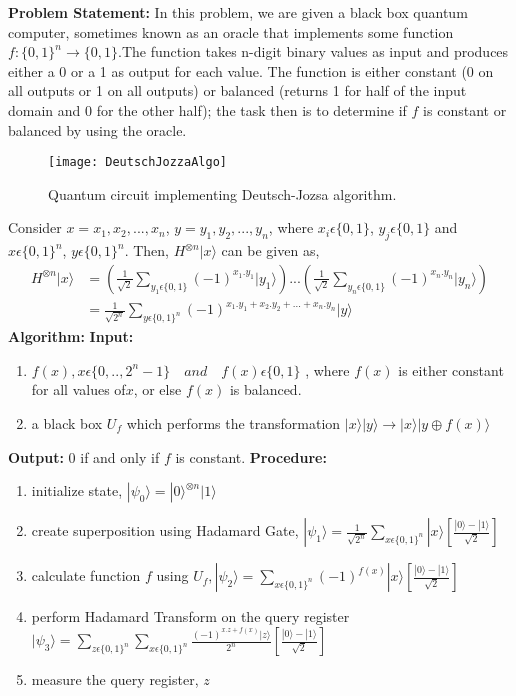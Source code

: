 \documentclass[12pt]{report}
\begin{document}
\textbf{Problem Statement:} \newline
In this problem, we are given a black box quantum computer, sometimes known as an oracle that implements some function $f:\{0,1\}^{n}\to\{0,1\}$.The function takes n-digit binary values as input and produces either a 0 or a 1 as output for each value. The function is either constant (0 on all outputs or 1 on all outputs) or balanced (returns 1 for half of the input domain and 0 for the other half); the task then is to determine if $f$ is constant or balanced by using the oracle. 
\begin{figure}[h]
\centering
\texttt{[image: DeutschJozzaAlgo]}
\caption{Quantum circuit implementing Deutsch-Jozsa algorithm.}
\label{fig:deutschjozzaalgo}
\end{figure}
\newline
Consider $x=x_{1},x_{2},...,x_{n}$, $y=y_{1},y_{2},...,y_{n}$, where $ x_{i} \epsilon \{0,1\}$, $y_{j} \epsilon \{0,1\}$ and $x\epsilon\{0,1\}^{n}$, $y\epsilon\{0,1\}^{n}$. Then, $H^{\otimes n}|x\rangle$ can be given as,
\begin{equation}
\begin{split}
H^{\otimes n}|x\rangle & = (\frac{1}{\sqrt{2}}\sum\limits_{y_{1}\epsilon\{0,1\}} (-1)^{x_{1}.y_{1}} |y_{1}\rangle)...(\frac{1}{\sqrt{2}}\sum\limits_{y_{n}\epsilon\{0,1\}} (-1)^{x_{n}.y_{n}} |y_{n}\rangle) \\
	& = \frac{1}{\sqrt{2^{n}}} \sum\limits_{y\epsilon\{0,1\}^{n}} (-1)^{x_{1}.y_{1}+x_{2}.y_{2}+...+x_{n}.y_{n}} |y\rangle
\end{split}
\end{equation}
\textbf{Algorithm:}\newline
\textbf{Input:}
\begin{enumerate}
	\item $f(x), x \epsilon \{0,..,2^{n}-1\} \quad and \quad f(x) \epsilon \{0,1\}$ , where $f(x)$ is either constant for all values of$x$, or else $f(x)$ is balanced.
	\item a black box $U_{f}$ which performs the transformation  $|x\rangle|y\rangle \to |x\rangle|y\oplus f(x)\rangle$
\end{enumerate}
\textbf{Output:} 0 if and only if $f$ is constant.
\newline\textbf{Procedure:}
\begin{enumerate}
	\item initialize state, $|\psi_{0}\rangle = |0\rangle^{\otimes n} |1\rangle$
	\item create superposition using Hadamard Gate, $ |\psi_{1}\rangle = \frac{1}{\sqrt{2^{n}}} \sum\limits_{x \epsilon\{0,1\}^{n}}|x\rangle\left[\frac{|0\rangle - |1\rangle}{\sqrt{2}}\right]$
	\item calculate function $f$ using $U_{f}, |\psi_{2}\rangle = \sum\limits_{x \epsilon\{0,1\}^{n}} (-1)^{f(x)}|x\rangle\left[\frac{|0\rangle - |1\rangle}{\sqrt{2}}\right]$
	\item perform Hadamard Transform on the query register $|\psi_{3}\rangle = \sum\limits_{z\epsilon\{0,1\}^{n}}\sum\limits_{x\epsilon\{0,1\}^{n}} \frac{(-1)^{x.z+f(x)} |z\rangle}{2^{n}}\left[\frac{|0\rangle-|1\rangle}{\sqrt{2}}\right]$
	\item measure the query register, $z$
\end{enumerate} 
\end{document}
